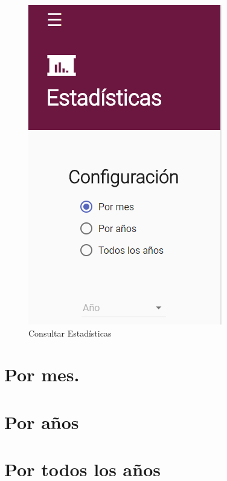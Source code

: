 	\begin{figure}[hbtp]

	\includegraphics[scale=0.3]{images/InterfazMovil/IUGS15_estadisticas.PNG}
	\caption{Consultar Estadísticas}
	\end{figure}
	

\section{Por mes.}
	

\section{Por años}
	


\section{Por todos los años}
	
